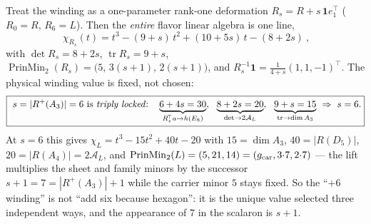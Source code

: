 \begin{keybox}
Treat the winding as a one-parameter rank-one deformation $R_s=R+s\,\mathbf1 e_1^{\!\top}$ ($R_0=R$,
$R_6=L$). Then the \emph{entire} flavor linear algebra is one line,
\[
  \boxed{\ \chi_{R_s}(t)=t^3-(9+s)\,t^2+(10+5s)\,t-(8+2s)\ },
\]
with $\det R_s=8+2s$, $\operatorname{tr}R_s=9+s$,
$\operatorname{PrinMin}_2(R_s)=\bigl(5,\,3(s{+}1),\,2(s{+}1)\bigr)$, and
$R_s^{-1}\mathbf1=\tfrac1{4+s}(1,1,-1)^{\!\top}$. The physical winding value is fixed, not chosen:
\[
  \boxed{\ s=|R^+(A_3)|=6\ \text{is \emph{triply locked}:}\quad
  \underbrace{6+4s=30}_{R_s^{\!\top}a\to h(E_8)},\ \ \underbrace{8+2s=20}_{\det\to2\mathcal A_L},\ \
  \underbrace{9+s=15}_{\operatorname{tr}\to\dim A_3}\ \Rightarrow\ s=6 .}
\]
At $s=6$ this gives $\chi_L=t^3-15t^2+40t-20$ with $15=\dim A_3$, $40=|R(D_5)|$, $20=|R(A_4)|=2\mathcal A_L$,
and $\operatorname{PrinMin}_2(L)=(5,21,14)=(g_{\mathrm{car}},3{\cdot}7,2{\cdot}7)$ --- the lift multiplies the sheet
and family minors by the successor $s{+}1=7=|R^+(A_3)|{+}1$ while the carrier minor $5$ stays fixed. So the
``$+6$ winding'' is not ``add six because hexagon'': it is the unique value selected three independent
ways, and the appearance of $7$ in the scalaron is $s{+}1$.
\end{keybox}

